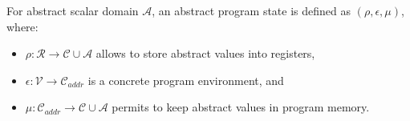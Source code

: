 \begin{definition}
    For abstract scalar domain $\mathcal{A}$, an abstract program state is
    defined as $(\rho, \epsilon, \mu)$, where:

    \begin{itemize}
        \itemsep0em
        \item $\rho:\mathcal{R} \rightarrow \mathcal{C} \cup \mathcal{A}$ allows to store abstract values into registers,
    \item $\epsilon:\mathcal{V} \rightarrow \mathcal{C}_{\textit{addr}}$ is a
        concrete program environment, and
    \item $\mu:\mathcal{C}_{\textit{addr}} \rightarrow \mathcal{C} \cup
        \mathcal{A}$ permits to keep abstract values in program memory.
    \end{itemize}
\end{definition}

